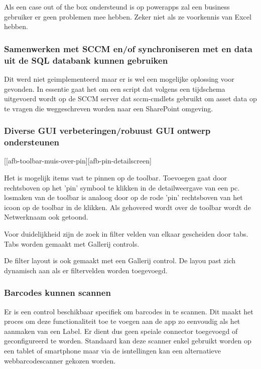 Als een case out of the box ondersteund is op powerapps zal een business gebruiker er geen problemen mee hebben. Zeker niet als ze voorkennis van Excel hebben.

\subsubsection{Samenwerken met SCCM en/of synchroniseren met en data uit de SQL databank kunnen gebruiken}

Dit werd niet geimplementeerd maar er is wel een mogelijke oplossing voor gevonden.
In essentie gaat het om een script dat volgens een tijdschema uitgevoerd wordt op de SCCM server dat sccm-cmdlets gebruikt om asset data op te vragen die weggeschreven worden naar een SharePoint omgeving.\autocite{Ziehnert2020}


\subsubsection{Diverse GUI verbeteringen/robuust GUI ontwerp ondersteunen}

[[afb-toolbar-muis-over-pin][afb-pin-detailscreen]

Het is mogelijk items vast te pinnen op de toolbar. Toevoegen gaat door rechtsboven op het 'pin' symbool te klikken in de detailweergave van een pc. losmaken van de toolbar is analoog door op de rode 'pin' rechtsboven van het icoon op de toolbar in de klikken. Als gehovered wordt over de toolbar wordt de Netwerknaam ook getoond.

Voor duidelijkheid zijn de zoek in filter velden van elkaar gescheiden door tabs. Tabs worden gemaakt met Gallerij controls.

De filter layout is ook gemaakt met een Gallerij control. De layou past zich dynamisch aan als er filtervelden worden toegevoegd.

\subsubsection{Barcodes kunnen scannen}

Er is een control beschikbaar specifiek om barcodes in te scannen. Dit maakt het proces om deze functionaliteit toe te voegen aan de app zo eenvoudig als het aanmaken van een Label. Er dient dus geen speiale connector toegevoegd of geconfigureerd te worden. Standaard kan deze scanner enkel gebruikt worden op een tablet of smartphone maar via de isntellingen kan een alternatieve webbarcodescanner gekozen worden.

